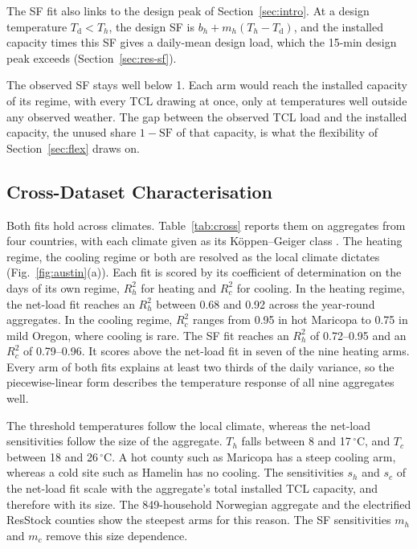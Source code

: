 The SF fit also links to the design peak of Section~\ref{sec:intro}. At a design temperature $T_{\mathrm{d}} < T_h$, the design SF is $b_h + m_h (T_h - T_{\mathrm{d}})$, and the installed capacity times this SF gives a daily-mean design load, which the 15-min design peak exceeds (Section~\ref{sec:res-sf}).

The observed SF stays well below 1. Each arm would reach the installed capacity of its regime, with every TCL drawing at once, only at temperatures well outside any observed weather. The gap between the observed TCL load and the installed capacity, the unused share $1-\mathrm{SF}$ of that capacity, is what the flexibility of Section~\ref{sec:flex} draws on.

\subsection{Cross-Dataset Characterisation}
\label{sec:cross}



Both fits hold across climates. Table~\ref{tab:cross} reports them on aggregates from four countries, with each climate given as its K{\"o}ppen--Geiger class \cite{beck2018koppen}. The heating regime, the cooling regime or both are resolved as the local climate dictates (Fig.~\ref{fig:austin}(a)). Each fit is scored by its coefficient of determination on the days of its own regime, $R^2_h$ for heating and $R^2_c$ for cooling. In the heating regime, the net-load fit reaches an $R^2_h$ between 0.68 and 0.92 across the year-round aggregates. In the cooling regime, $R^2_c$ ranges from 0.95 in hot Maricopa to 0.75 in mild Oregon, where cooling is rare. The SF fit reaches an $R^2_h$ of 0.72--0.95 and an $R^2_c$ of 0.79--0.96. It scores above the net-load fit in seven of the nine heating arms. Every arm of both fits explains at least two thirds of the daily variance, so the piecewise-linear form describes the temperature response of all nine aggregates well.

The threshold temperatures follow the local climate, whereas the net-load sensitivities follow the size of the aggregate. $T_h$ falls between 8 and 17\,$^\circ$C, and $T_c$ between 18 and 26\,$^\circ$C. A hot county such as Maricopa has a steep cooling arm, whereas a cold site such as Hamelin has no cooling. The sensitivities $s_h$ and $s_c$ of the net-load fit scale with the aggregate's total installed TCL capacity, and therefore with its size. The 849-household Norwegian aggregate and the electrified ResStock counties show the steepest arms for this reason. The SF sensitivities $m_h$ and $m_c$ remove this size dependence.


